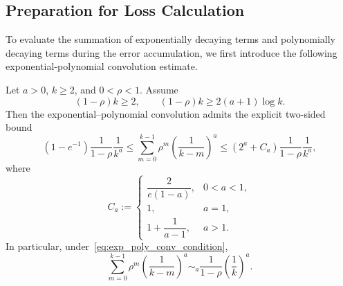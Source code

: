 \subsection{Preparation for Loss Calculation}
\label{app:pol_preparation}

To evaluate the summation of exponentially decaying terms and polynomially decaying terms during the error accumulation, we first introduce the following exponential-polynomial convolution estimate.

\begin{lemma}
\label{lem:pol_convolution_estimates1}
Let $a>0$, $k\ge 2$, and $0<\rho<1$. Assume
\begin{equation}
\label{eq:exp_poly_conv_condition}
    (1-\rho)k\ge 2,
    \qquad
    (1-\rho)k\ge 2(a+1)\log k.
\end{equation}
Then the exponential--polynomial convolution admits the explicit two-sided bound
\begin{equation}
\label{eq:exp_poly_conv_explicit}
    (1-e^{-1})
    \frac{1}{1-\rho}\frac{1}{k^a}
    \le
    \sum_{m=0}^{k-1}\rho^m\left(\frac{1}{k-m}\right)^a
    \le
    \left(2^a+C_a\right)\frac{1}{1-\rho}\frac{1}{k^a},
\end{equation}
where
\begin{equation}
\label{eq:Ca_exp_poly_conv}
    C_a:=
    \begin{cases}
    \dfrac{2}{e(1-a)}, & 0<a<1,\\[6pt]
    1, & a=1,\\[6pt]
    1+\dfrac{1}{a-1}, & a>1.
    \end{cases}
\end{equation}
In particular, under~\eqref{eq:exp_poly_conv_condition},
\[
    \sum_{m=0}^{k-1}\rho^m\left(\frac{1}{k-m}\right)^a
    \sim_{a}
    \frac{1}{1-\rho}\left(\frac{1}{k}\right)^a .
\]
\end{lemma}

